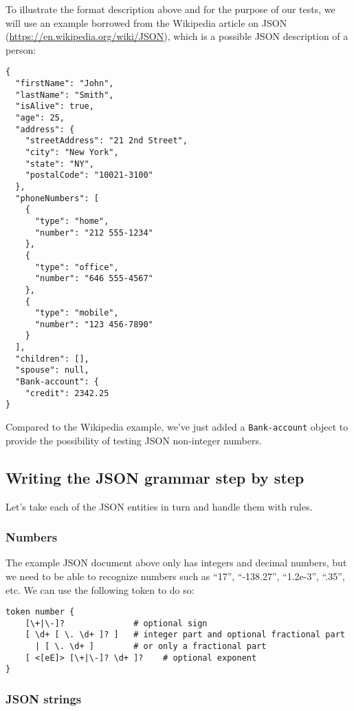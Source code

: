 To illustrate the format description above and for the 
purpose of our tests, we will use an example borrowed from 
the Wikipedia article on JSON 
(\url{https://en.wikipedia.org/wiki/JSON}), which is a 
possible JSON description of a person:

\begin{verbatim}
{
  "firstName": "John",
  "lastName": "Smith",
  "isAlive": true,
  "age": 25,
  "address": {
    "streetAddress": "21 2nd Street",
    "city": "New York",
    "state": "NY",
    "postalCode": "10021-3100"
  },
  "phoneNumbers": [
    {
      "type": "home",
      "number": "212 555-1234"
    },
    {
      "type": "office",
      "number": "646 555-4567"
    },
    {
      "type": "mobile",
      "number": "123 456-7890"
    }
  ],
  "children": [],
  "spouse": null,  
  "Bank-account": {
    "credit": 2342.25
}
\end{verbatim}

Compared to the Wikipedia example, we've just added a 
\verb'Bank-account' object to provide the possibility 
of testing JSON non-integer numbers.
 
\subsection{Writing the JSON grammar step by step}

Let's take each of the JSON entities in turn and handle 
them with rules.

\subsubsection{Numbers}

The example JSON document above only has integers and decimal 
numbers, but we need to be able to recognize numbers such 
as ``17'', ``-138.27'', ``1.2e-3'', ``.35'', etc. We can 
use the following token to do so:

\begin{verbatim}
token number {
    [\+|\-]?              # optional sign
    [ \d+ [ \. \d+ ]? ]   # integer part and optional fractional part
      | [ \. \d+ ]        # or only a fractional part
    [ <[eE]> [\+|\-]? \d+ ]?    # optional exponent
}
\end{verbatim}

\subsubsection{JSON strings}

